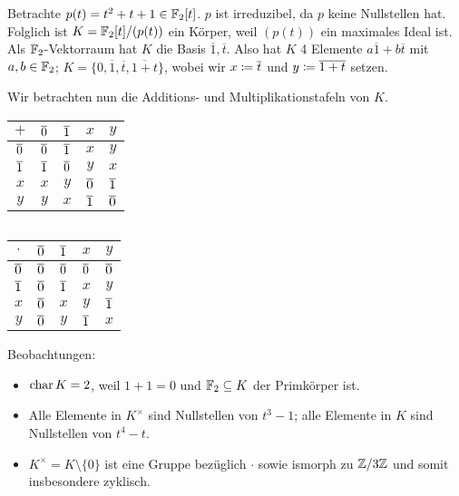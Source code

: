 \documentclass[12pt,a4paper]{scrartcl}
\begin{document}
\begin{bsp}
	Betrachte $p(t) = t^2+t+1\in \mathbb F_2[t]$. $p$ ist irreduzibel, da $p$ keine Nullstellen hat. Folglich ist $K = \mathbb F_2[t]/(p(t))$ ein Körper, weil $(p(t))$ ein maximales Ideal ist. Als $\mathbb F_2$-Vektorraum hat $K$ die Basis $\overline{1}, \overline{t}$. Also hat $K$ 4 Elemente $a\overline{1}+b\overline{t}$ mit $a,b\in \mathbb F_2$; $K = \{0,\overline{ 1},\overline{ t}, \overline{1+t}\}$, wobei wir $x \coloneqq \overline t$ und $y \coloneqq \overline{1+t}$ setzen.
	
	Wir betrachten nun die Additions- und Multiplikationstafeln von $K$.
	\begin{center}
		\begin{tabular}{c||c|c|c|c}
			$+$ & $\overline 0$ & $\overline 1$ & $x$ & $y$  \\
			\hline \hline
			$\overline 0$ & $\overline 0$ & $\overline 1$ & $x$ & $y$ \\
			\hline
			$\overline 1$ & $\overline 1$ & $\overline 0$ & $y$ & $x$ \\
			\hline
			$x$ & $x$ & $y$ & $\overline 0$ & $\overline 1$ \\
			\hline
			$y$ & $y$ & $x$ & $\overline 1$ & $\overline 0$ \\
		\end{tabular} $\qquad$
		\begin{tabular}{c||c|c|c|c}
			$\cdot$ & $\overline 0$ & $\overline 1$ & $x$ & $y$  \\
			\hline \hline
			$\overline 0$ & $\overline 0$ & $\overline 0$ & $\overline 0$ & $\overline 0$ \\
			\hline
			$\overline 1$ & $\overline 0$ & $\overline 1$ & $x$ & $y$ \\
			\hline
			$x$ & $\overline 0$ & $x$ & $y$ & $\overline 1$ \\
			\hline
			$y$ & $\overline 0$ & $y$ & $\overline 1$ & $x$ \\
		\end{tabular}
	\end{center}
	
	\noindent Beobachtungen:
	\begin{itemize}
		\item $\operatorname{char}{K} = 2$, weil $1+1 = 0$ und $\mathbb F_2\subseteq K$ der Primkörper ist.
		\item Alle Elemente in $K^{\times}$ sind Nullstellen von $t^3-1$; alle Elemente in $K$ sind Nullstellen von $t^4 -t$.
		\item $K^{\times} = K\setminus \{0\}$ ist eine Gruppe bezüglich $\cdot$ sowie ismorph zu $\mathbb Z/3\mathbb Z$ und somit insbesondere zyklisch.
	\end{itemize}
\end{bsp}
\end{document}
